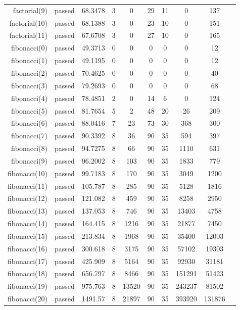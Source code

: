 \begin{longtable}{r|ccccccccc}
    factorial(9) & passed & 68.3478 & 3 & 0 & 29 & 11 & 0 & 137 \\
    factorial(10) & passed & 68.1388 & 3 & 0 & 23 & 10 & 0 & 151 \\
    factorial(11) & passed & 67.6708 & 3 & 0 & 27 & 10 & 0 & 165 \\
    fibonacci(0) & passed & 49.3713 & 0 & 0 & 0 & 0 & 0 & 12 \\
    fibonacci(1) & passed & 49.1195 & 0 & 0 & 0 & 0 & 0 & 12 \\
    fibonacci(2) & passed & 70.4625 & 0 & 0 & 0 & 0 & 0 & 40 \\
    fibonacci(3) & passed & 79.2693 & 0 & 0 & 0 & 0 & 0 & 68 \\
    fibonacci(4) & passed & 78.4851 & 2 & 0 & 14 & 6 & 0 & 124 \\
    fibonacci(5) & passed & 81.7654 & 5 & 2 & 48 & 20 & 26 & 209 \\
    fibonacci(6) & passed & 88.0416 & 7 & 23 & 73 & 30 & 368 & 300 \\
    fibonacci(7) & passed & 90.3392 & 8 & 36 & 90 & 35 & 594 & 397 \\
    fibonacci(8) & passed & 94.7275 & 8 & 66 & 90 & 35 & 1110 & 631 \\
    fibonacci(9) & passed & 96.2002 & 8 & 103 & 90 & 35 & 1833 & 779 \\
    fibonacci(10) & passed & 99.7183 & 8 & 170 & 90 & 35 & 3049 & 1200 \\
    fibonacci(11) & passed & 105.787 & 8 & 285 & 90 & 35 & 5128 & 1816 \\
    fibonacci(12) & passed & 121.082 & 8 & 459 & 90 & 35 & 8258 & 2950 \\
    fibonacci(13) & passed & 137.053 & 8 & 746 & 90 & 35 & 13403 & 4758 \\
    fibonacci(14) & passed & 164.415 & 8 & 1216 & 90 & 35 & 21877 & 7450 \\
    fibonacci(15) & passed & 213.834 & 8 & 1968 & 90 & 35 & 35400 & 12003 \\
    fibonacci(16) & passed & 300.618 & 8 & 3175 & 90 & 35 & 57102 & 19303 \\
    fibonacci(17) & passed & 425.909 & 8 & 5164 & 90 & 35 & 92930 & 31181 \\
    fibonacci(18) & passed & 656.797 & 8 & 8466 & 90 & 35 & 151291 & 51423 \\
    fibonacci(19) & passed & 975.763 & 8 & 13520 & 90 & 35 & 243237 & 81502 \\
    fibonacci(20) & passed & 1491.57 & 8 & 21897 & 90 & 35 & 393920 & 131876 \\

\end{longtable}
